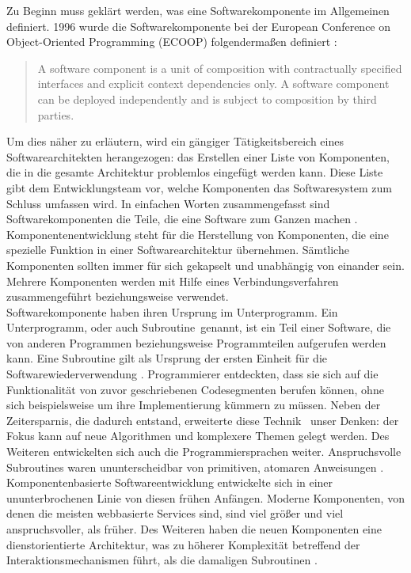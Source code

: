 Zu Beginn muss geklärt werden, was eine Softwarekomponente im Allgemeinen definiert. 1996 wurde die Softwarekomponente bei der European Conference on Object-Oriented Programming (ECOOP) folgendermaßen definiert \autocite{Szyperski.2002}:
\begin{quote}
\glqq A software component is a unit of composition with contractually specified interfaces and explicit context dependencies only. A software component can be deployed independently and is subject to composition by third parties.\grqq
\end{quote}
Um dies näher zu erläutern, wird ein gängiger Tätigkeitsbereich eines Softwarearchitekten herangezogen: das Erstellen einer Liste von Komponenten, die in die gesamte Architektur problemlos eingefügt werden kann. Diese Liste gibt dem Entwicklungsteam vor, welche Komponenten das Softwaresystem zum Schluss umfassen wird. In einfachen Worten zusammengefasst sind Softwarekomponenten die Teile, die eine Software zum Ganzen machen \citereset \autocite{Szyperski.2002}.\\
Komponentenentwicklung steht für die Herstellung von Komponenten, die eine spezielle Funktion in einer Softwarearchitektur übernehmen. Sämtliche Komponenten sollten immer für sich gekapselt und unabhängig von einander sein. Mehrere Komponenten werden mit Hilfe eines Verbindungsverfahren zusammengeführt beziehungsweise verwendet. \\
Softwarekomponente haben ihren Ursprung im \glqq Unterprogramm\grqq . Ein \glqq Unterprogramm\grqq , oder auch \glqq Subroutine\grqq\ genannt, ist ein Teil einer Software, die von anderen Programmen beziehungsweise Programmteilen aufgerufen werden kann. Eine Subroutine gilt als Ursprung der ersten Einheit für die Softwarewiederverwendung \autocite{Wheeler.1985}. Programmierer entdeckten, dass sie sich auf die Funktionalität von zuvor geschriebenen Codesegmenten berufen können, ohne sich beispielsweise um ihre Implementierung kümmern zu müssen. Neben der Zeitersparnis, die dadurch entstand, erweiterte diese \glqq Technik \grqq\ unser Denken:
der Fokus kann auf neue Algorithmen und komplexere Themen gelegt werden. Des Weiteren entwickelten sich auch die Programmiersprachen weiter. Anspruchsvolle Subroutines waren ununterscheidbar von primitiven, atomaren Anweisungen \autocite{Szyperski.2002}.\\
Komponentenbasierte Softwareentwicklung entwickelte sich in einer ununterbrochenen Linie von diesen frühen Anfängen. Moderne Komponenten, von denen die meisten webbasierte Services sind, sind viel größer und viel anspruchsvoller, als früher. Des Weiteren haben die neuen Komponenten eine dienstorientierte Architektur, was zu höherer Komplexität betreffend der Interaktionsmechanismen führt, als die damaligen Subroutinen \autocite{Andresen.2003}. \\
